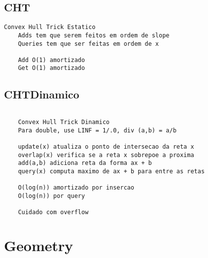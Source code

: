 \vspace{-2pt}
\subsection{CHT}
\vspace{-4pt}
\begin{lstlisting}[style=description]
	Convex Hull Trick Estatico
	Adds tem que serem feitos em ordem de slope
	Queries tem que ser feitas em ordem de x

	Add O(1) amortizado
	Get O(1) amortizado

\end{lstlisting}
\vspace{-5pt}
\raggedbottom
\hrulefill

\vspace{-2pt}
\subsection{CHTDinamico}
\vspace{-4pt}
\begin{lstlisting}[style=description]

	Convex Hull Trick Dinamico
	Para double, use LINF = 1/.0, div (a,b) = a/b

	update(x) atualiza o ponto de intersecao da reta x
	overlap(x) verifica se a reta x sobrepoe a proxima
	add(a,b) adiciona reta da forma ax + b
	query(x) computa maximo de ax + b para entre as retas

	O(log(n)) amortizado por insercao
	O(log(n)) por query

	Cuidado com overflow

\end{lstlisting}
\vspace{-5pt}
\raggedbottom
\hrulefill


\section{Geometry}
\vspace{-2pt}

